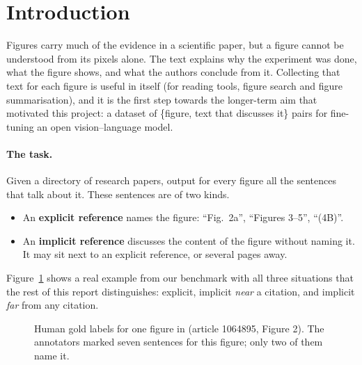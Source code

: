 \section{Introduction}
\label{sec:intro}

Figures carry much of the evidence in a scientific paper, but a figure cannot be understood from its pixels
alone. The text explains why the experiment was done, what the figure shows, and what the authors conclude from
it. Collecting that text for each figure is useful in itself (for reading tools, figure search and figure
summarisation), and it is the first step towards the longer-term aim that motivated this project: a dataset of
\{figure, text that discusses it\} pairs for fine-tuning an open vision--language model.

\paragraph{The task.} Given a directory of research papers, output for every figure all the sentences that talk
about it. These sentences are of two kinds.
\begin{itemize}
  \item An \textbf{explicit reference} names the figure: ``Fig.~2a'', ``Figures 3--5'', ``(4B)''.
  \item An \textbf{implicit reference} discusses the content of the figure without naming it. It may sit next
        to an explicit reference, or several pages away.
\end{itemize}
Figure~\ref{fig:example} shows a real example from our benchmark with all three situations that the rest of
this report distinguishes: explicit, implicit \emph{near} a citation, and implicit \emph{far} from any citation.

\begin{figure}[h]
\centering
{}
\caption{Human gold labels for one figure in \figsum{} (article 1064895, Figure 2). The annotators marked seven
sentences for this figure; only two of them name it.}
\label{fig:example}
\end{figure}

